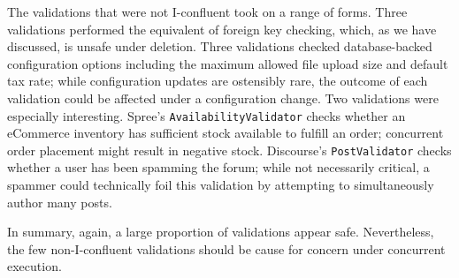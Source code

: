The validations that were not I-confluent took on a range of
forms. Three validations performed the equivalent of foreign key
checking, which, as we have discussed, is unsafe under deletion. Three
validations checked database-backed configuration options including
the maximum allowed file upload size and default tax rate; while
configuration updates are ostensibly rare, the outcome of each
validation could be affected under a configuration change. Two
validations were especially interesting. Spree's
\texttt{AvailabilityValidator} checks whether an eCommerce inventory
has sufficient stock available to fulfill an order; concurrent order
placement might result in negative stock. Discourse's
\texttt{PostValidator} checks whether a user has been spamming the
forum; while not necessarily critical, a spammer could technically
foil this validation by attempting to simultaneously author many posts.

In summary, again, a large proportion of validations appear
safe. Nevertheless, the few non-I-confluent validations should be
cause for concern under concurrent execution.


